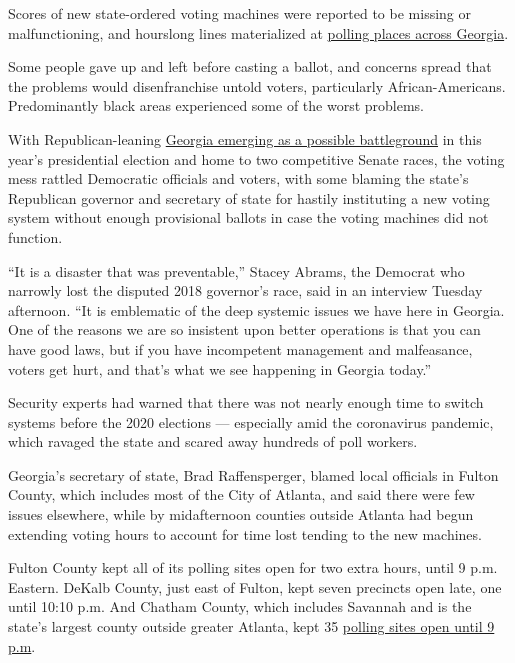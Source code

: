 Scores of new state-ordered voting machines were reported to be missing
or malfunctioning, and hourslong lines materialized at
\href{https://www.nytimes3xbfgragh.onion/2020/06/11/podcasts/the-daily/georgia-general-election.html}{polling
places across Georgia}.

Some people gave up and left before casting a ballot, and concerns
spread that the problems would disenfranchise untold voters,
particularly African-Americans. Predominantly black areas experienced
some of the worst problems.

With Republican-leaning
\href{https://www.nytimes3xbfgragh.onion/2020/06/09/us/politics/georgia-primary-election-senate-race-jon-ossoff.html}{Georgia
emerging as a possible battleground} in this year's presidential
election and home to two competitive Senate races, the voting mess
rattled Democratic officials and voters, with some blaming the state's
Republican governor and secretary of state for hastily instituting a new
voting system without enough provisional ballots in case the voting
machines did not function.

``It is a disaster that was preventable,'' Stacey Abrams, the Democrat
who narrowly lost the disputed 2018 governor's race, said in an
interview Tuesday afternoon. ``It is emblematic of the deep systemic
issues we have here in Georgia. One of the reasons we are so insistent
upon better operations is that you can have good laws, but if you have
incompetent management and malfeasance, voters get hurt, and that's what
we see happening in Georgia today.''

Security experts had warned that there was not nearly enough time to
switch systems before the 2020 elections --- especially amid the
coronavirus pandemic, which ravaged the state and scared away hundreds
of poll workers.

Georgia's secretary of state, Brad Raffensperger, blamed local officials
in Fulton County, which includes most of the City of Atlanta, and said
there were few issues elsewhere, while by midafternoon counties outside
Atlanta had begun extending voting hours to account for time lost
tending to the new machines.

Fulton County kept all of its polling sites open for two extra hours,
until 9 p.m. Eastern. DeKalb County, just east of Fulton, kept seven
precincts open late, one until 10:10 p.m. And Chatham County, which
includes Savannah and is the state's largest county outside greater
Atlanta, kept 35
\href{https://cccdn.blob.core.windows.net/cdn/Files/Elections/Election\%20Archive/2020/Press\%20Release\%20-\%20Extend\%20Poll\%20Hours\%20AUTHORIZED.pdf}{polling
sites open until 9 p.m}.


